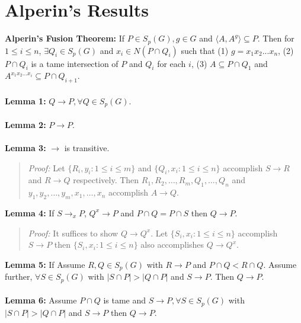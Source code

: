\section {Alperin's Results}
{\bf Alperin's Fusion Theorem:}
If $P \in S_p(G), g \in G$ and $ \langle A, A^g \rangle \subseteq P$.  Then 
for $1 \le i \le n$, $\exists Q_i \in S_p (G)$ and $x_i \in N(P \cap Q_i)$ such
that (1) $g= x_1 x_2 ... x_n$,
(2) $P \cap Q_i$ is a tame intersection of $P$ and $Q_i$ for each $i$,
(3) $A \subseteq P \cap Q_1$ and
$A^{x_1 x_2 ... x_i} \subseteq P \cap Q_{i+1}$.
\\
\\
{\bf Lemma 1:}
$Q \rightarrow P, \forall Q \in S_p(G)$.
\\
\\
{\bf Lemma 2:}
$P \rightarrow P$. 
\\
\\
{\bf Lemma 3:}
$\rightarrow$ is transitive.
\begin{quote}
\emph{Proof:} 
Let $\{R_i, y_i: 1 \le i \le m \}$ and
$\{Q_i, x_i: 1 \le i \le n \}$ accomplish $S \rightarrow R$ and $R \rightarrow Q$
respectively.  Then $R_1 , R_2 , \ldots , R_m , Q_1, \ldots , Q_n$ and
$y_1 , y_2 , \ldots , y_m , x_1 , \ldots , x_n$ accomplish $A \rightarrow Q$.
\end{quote}
{\bf Lemma 4:}
If $S \rightarrow_x P$, $Q^x \rightarrow P$ and $P \cap Q = P \cap S$
then $Q \rightarrow P$.
\begin{quote}
\emph{Proof:} It suffices to show $Q \rightarrow Q^x$.
Let $\{S_i, x_i: 1 \le i \le n \}$
accomplish $S \rightarrow P$ then
$\{S_i, x_i: 1 \le i \le n \}$ also accomplishes
$Q \rightarrow Q^x$.
\end{quote}
{\bf Lemma 5:}  If 
Assume $R, Q \in S_p(G)$ with $R \rightarrow P$ and $P \cap Q < R \cap Q$.  Assume further,
$\forall S \in S_p(G)$ with $|S \cap P| > |Q \cap  P|$ and $S \rightarrow P$.  Then
$Q \rightarrow P$.
\\
\\
{\bf Lemma 6:}
Assume $P \cap Q$ is tame and 
$S \rightarrow P, \forall S \in S_p(G)$ with $|S \cap P| > |Q \cap P|$ and $S \rightarrow P$
then $Q \rightarrow P$.
